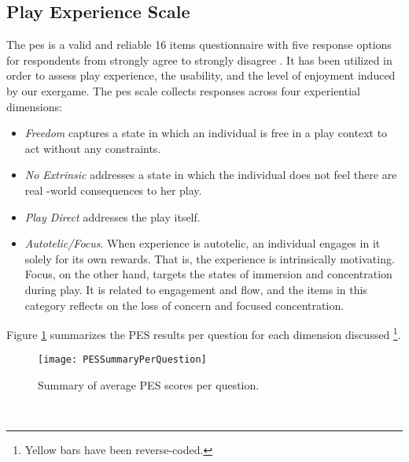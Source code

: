 \subsection{Play Experience Scale}
The \acrfull{pes} is a valid and reliable 16 items questionnaire with five response options for respondents from strongly agree to strongly disagree \cite{pavlas2012play}. It has been utilized in order to assess play experience, the usability, and the level of enjoyment induced by our exergame. The \gls{pes} scale collects responses across four experiential dimensions: \begin{itemize}
\item \textit{Freedom} captures a state in which an individual is free in a play context to act without any constraints. 
\item \textit{No Extrinsic} addresses a state in which the individual does not feel there are real -world consequences to her play.
\item \textit{Play Direct} addresses the play itself.
\item \textit{Autotelic/Focus}. When experience is autotelic, an individual engages in it solely for its own rewards. That is, the experience is intrinsically motivating.  Focus, on the other hand, targets the states of immersion and concentration during play. It is related to engagement and flow, and the items in this category  reflects on the loss of concern and focused concentration.
\end{itemize}
Figure \ref{fig:pesPerQuestion} summarizes the PES results per question for each dimension discussed \footnote{Yellow bars have been reverse-coded.}.\\
\begin{figure}[h]
    \centering
    \texttt{[image: PESSummaryPerQuestion]}
    \caption{Summary of average PES scores per question.}
    \label{fig:pesPerQuestion}
\end{figure}\\
